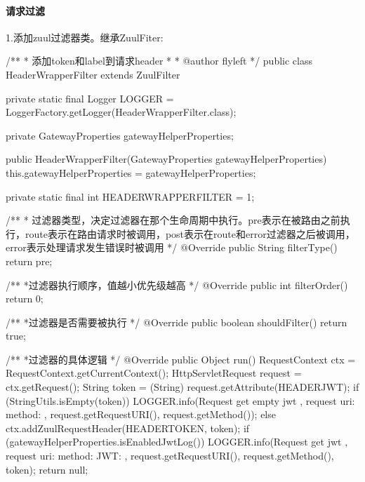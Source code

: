 \documentclass[letterpaper,10pt,english]{sphinxmanual}
\begin{document}
\paragraph{请求过滤}
\label{\detokenize{01.spring-cloud/04.zuul/zuul_01:id5}}
1.添加zuul过滤器类。继承ZuulFiter:

\begin{sphinxVerbatim}[commandchars=\\\{\}]
/**
* 添加token和label到请求header
*
* @author flyleft
*/
public class HeaderWrapperFilter extends ZuulFilter \PYGZob{}

    private static final Logger LOGGER = LoggerFactory.getLogger(HeaderWrapperFilter.class);

    private GatewayProperties gatewayHelperProperties;

    public HeaderWrapperFilter(GatewayProperties gatewayHelperProperties) \PYGZob{}
        this.gatewayHelperProperties = gatewayHelperProperties;
    \PYGZcb{}

    private static final int HEADER\PYGZus{}WRAPPER\PYGZus{}FILTER = \PYGZhy{}1;

    /**
     * 过滤器类型，决定过滤器在那个生命周期中执行。pre表示在被路由之前执行，route表示在路由请求时被调用，post表示在route和error过滤器之后被调用，error表示处理请求发生错误时被调用
     */
    @Override
    public String filterType() \PYGZob{}
        return \PYGZdq{}pre\PYGZdq{};
    \PYGZcb{}

    /**
     *过滤器执行顺序，值越小优先级越高
     */
    @Override
    public int filterOrder() \PYGZob{}
        return 0;
    \PYGZcb{}

    /**
     *过滤器是否需要被执行
     */
    @Override
    public boolean shouldFilter() \PYGZob{}
        return true;
    \PYGZcb{}

    /**
     *过滤器的具体逻辑
     */
    @Override
    public Object run() \PYGZob{}
        RequestContext ctx = RequestContext.getCurrentContext();
        HttpServletRequest request = ctx.getRequest();
        String token = (String) request.getAttribute(HEADER\PYGZus{}JWT);
        if (StringUtils.isEmpty(token)) \PYGZob{}
            LOGGER.info(\PYGZdq{}Request get empty jwt , request uri: \PYGZob{}\PYGZcb{} method: \PYGZob{}\PYGZcb{}\PYGZdq{}, request.getRequestURI(), request.getMethod());
        \PYGZcb{} else \PYGZob{}
            ctx.addZuulRequestHeader(HEADER\PYGZus{}TOKEN, token);
            if (gatewayHelperProperties.isEnabledJwtLog()) \PYGZob{}
                LOGGER.info(\PYGZdq{}Request get jwt , request uri: \PYGZob{}\PYGZcb{} method: \PYGZob{}\PYGZcb{} JWT: \PYGZob{}\PYGZcb{}\PYGZdq{},
                        request.getRequestURI(), request.getMethod(), token);
            \PYGZcb{}
        \PYGZcb{}
        return null;
    \PYGZcb{}
\end{sphinxVerbatim}
\end{document}
